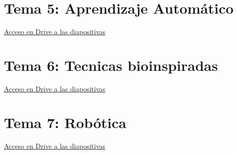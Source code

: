 \documentclass[12pt, twoside, openright]{report} %
\begin{document}
\chapter{Tema 5: Aprendizaje Automático}
\href{https://drive.google.com/file/d/1LI9yhfP9Ln8pNsRSsPNDDnHGNqfDMPcd}{Acceso en Drive a las diapositivas}

\chapter{Tema 6: Tecnicas bioinspiradas}
\href{https://drive.google.com/file/d/1yPlKdsKnWpFO3Jqh7U2IcJ1cHM6H5vnZ}{Acceso en Drive a las diapositivas}

\chapter{Tema 7: Robótica}
\href{https://drive.google.com/file/d/1yMhsPLLKCZ4Nap7Vca12DfdT8iD_fqJf}{Acceso en Drive a las diapositivas}
\end{document}
